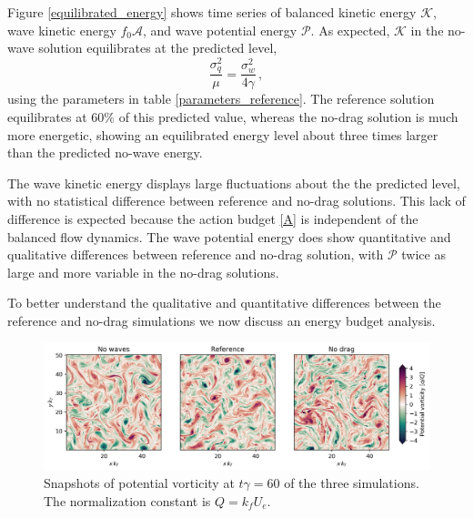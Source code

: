 \documentclass[12pt]{article}
\newcommand{\com}{\, ,}
\def\beq{\begin{equation}}
\def\eeq{\end{equation}}
\newcommand{\A}{\mathscr{A}}
\newcommand{\K}{\mathscr{K}}
\renewcommand{\P}{\mathscr{P}}
\newcommand{\?}{\stackrel{?}{=}}
\begin{document}
Figure \ref{equilibrated_energy} shows time series of balanced kinetic energy $\K$,
wave kinetic energy $f_0\A$, and wave potential energy $\P$.  As expected, $\K$ in
the no-wave solution equilibrates at the predicted level,
\beq
\frac{\sigma_q^2}{\mu} = \frac{\sigma_w^2}{4\gamma}\com
\eeq
using the parameters in table \ref{parameters_reference}. The reference solution
equilibrates at $60\%$ of this predicted value, whereas the no-drag solution is
much more energetic, showing an equilibrated energy level about three
times larger than the predicted no-wave energy.

The wave kinetic energy displays large fluctuations about the the predicted level,
with no statistical difference between reference and no-drag solutions. This lack
of difference is expected because the action budget \eqref{A} is independent of the
balanced flow dynamics. The wave potential energy does show quantitative and
qualitative differences between reference and no-drag solution, with $\P$ twice
as large and more variable in the no-drag solutions.

To better understand the qualitative and quantitative differences between the reference
and no-drag simulations we now discuss an energy budget analysis.

\begin{figure}
\centering
\includegraphics[width=1.\textwidth]{figs/snapshots_pv_t_60.png}
\caption{Snapshots of potential vorticity at $t\gamma  = 60$ of the three simulations.
          The normalization constant is $Q = k_f U_e$.}
        \label{equilibrated_pv}
\end{figure}
\end{document}
